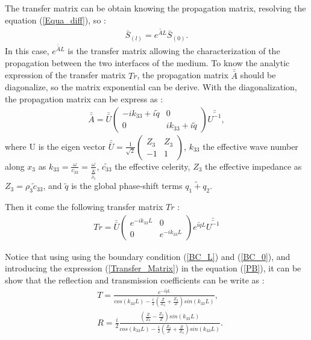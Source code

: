 \documentclass{article}
\begin{document}
    The transfer matrix can be obtain knowing the propagation matrix, resolving the equation (\ref{Equa_diff}), so :
    \begin{align}
    \bar{S}_{(l)}=e^{\bar{\bar{A}}L}\bar{S}_{(0)}.\label{PB}
    \end{align}
    In this case, $e^{\bar{\bar{A}}L}$ is the transfer matrix allowing the characterization of the propagation between the two interfaces of the medium.
    To know the analytic expression of the transfer matrix $Tr$, the propagation matrix $\bar{\bar{A}}$ should be diagonalize, so the matrix exponential can be derive.
    With the diagonalization, the propagation matrix can be express as :
     \begin{align}
    \bar{\bar{A}}=\bar{\bar{U}} \begin{pmatrix}
    								-ik_{33}+i\tilde{q} & 0 \\ 0 & ik_{33}+i\tilde{q} 
    							\end{pmatrix} \bar{\bar{U^{-1}}},
    \end{align}
    where U is the eigen vector $\bar{\bar{U}}=\frac{1}{\sqrt{2}}\begin{pmatrix} Z_3 & Z_3 \\ -1 & 1 \end{pmatrix}$, $k_{33}$ the effective wave number along $x_3$ as $k_{33}=\frac{\omega}{c_{33}}=\frac{\omega}{\frac{\tilde{K}}{\tilde{\rho_3}}}$, $\tilde{c_{33}}$ the effective celerity, $Z_3$ the effective impedance as $Z_3=\tilde{\rho_3c_{33}}$, and $\tilde{q}$ is the global phase-shift terms $\tilde{q_1+q_2}$.
    
    Then it come the following transfer matrix $Tr$ :
        \begin{align}
    Tr=\bar{\bar{U}}\begin{pmatrix}
    e^{-ik_{33}L} & 0 \\ 0 & e^{-ik_{33}L} 
    \end{pmatrix} e^{i\tilde{q}L}\bar{\bar{U^{-1}}}\label{Transfer_Matrix}
    \end{align}
    
    Notice that using using the boundary condition (\ref{BC_L}) and (\ref{BC_0}), and introducing the expression (\ref{Transfer_Matrix}) in the equation  (\ref{PB}), it can be show that the reflection and transmission coefficients can be write as :
        \begin{align}
    &T=\frac{e^{-i\tilde{q}L}}{cos(k_{33}L)-\frac{i}{2}(\frac{Z}{Z_3}+\frac{Z_3}{Z})sin(k_{33}L)}\label{Transmission},\\ 
    &R=\frac{i}{2} \frac{(\frac{Z}{Z_3}-\frac{Z_3}{Z})sin(k_{33}L)}{cos(k_{33}L)-\frac{i}{2}(\frac{Z_3}{Z}+\frac{Z}{Z_3})sin(k_{33}L)}\label{Reflexion}. 
      \end{align}
\end{document}

